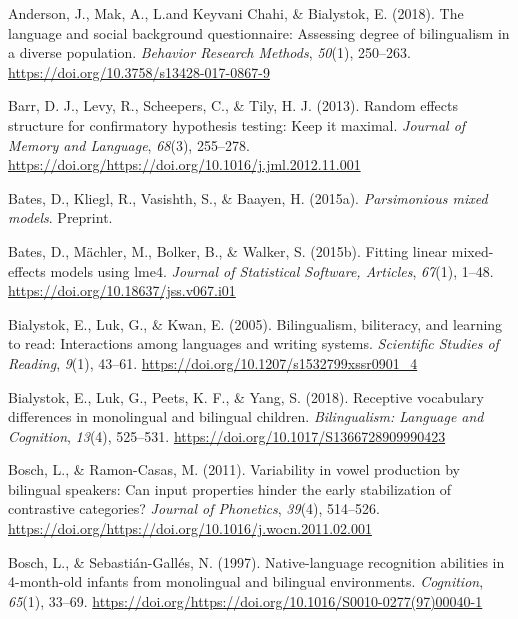\documentclass[,man,floatsintext]{apa6}
\begin{document}
\begingroup
\setlength{\parindent}{-0.5in}
\setlength{\leftskip}{0.5in}

\hypertarget{refs}{}
\leavevmode\hypertarget{ref-anderson_2018}{}%
Anderson, J., Mak, A., L.and Keyvani Chahi, \& Bialystok, E. (2018). The language and social background questionnaire: Assessing degree of bilingualism in a diverse population. \emph{Behavior Research Methods}, \emph{50}(1), 250--263. \url{https://doi.org/10.3758/s13428-017-0867-9}

\leavevmode\hypertarget{ref-barr_2013}{}%
Barr, D. J., Levy, R., Scheepers, C., \& Tily, H. J. (2013). Random effects structure for confirmatory hypothesis testing: Keep it maximal. \emph{Journal of Memory and Language}, \emph{68}(3), 255--278. \url{https://doi.org/https://doi.org/10.1016/j.jml.2012.11.001}

\leavevmode\hypertarget{ref-bates_2015a}{}%
Bates, D., Kliegl, R., Vasishth, S., \& Baayen, H. (2015a). \emph{Parsimonious mixed models}. Preprint.

\leavevmode\hypertarget{ref-bates_2015b}{}%
Bates, D., Mächler, M., Bolker, B., \& Walker, S. (2015b). Fitting linear mixed-effects models using lme4. \emph{Journal of Statistical Software, Articles}, \emph{67}(1), 1--48. \url{https://doi.org/10.18637/jss.v067.i01}

\leavevmode\hypertarget{ref-bialystok_2005}{}%
Bialystok, E., Luk, G., \& Kwan, E. (2005). Bilingualism, biliteracy, and learning to read: Interactions among languages and writing systems. \emph{Scientific Studies of Reading}, \emph{9}(1), 43--61. \url{https://doi.org/10.1207/s1532799xssr0901_4}

\leavevmode\hypertarget{ref-bialystok_2018}{}%
Bialystok, E., Luk, G., Peets, K. F., \& Yang, S. (2018). Receptive vocabulary differences in monolingual and bilingual children. \emph{Bilingualism: Language and Cognition}, \emph{13}(4), 525--531. \url{https://doi.org/10.1017/S1366728909990423}

\leavevmode\hypertarget{ref-bosch_2011}{}%
Bosch, L., \& Ramon-Casas, M. (2011). Variability in vowel production by bilingual speakers: Can input properties hinder the early stabilization of contrastive categories? \emph{Journal of Phonetics}, \emph{39}(4), 514--526. \url{https://doi.org/https://doi.org/10.1016/j.wocn.2011.02.001}

\leavevmode\hypertarget{ref-bosch_1997}{}%
Bosch, L., \& Sebastián-Gallés, N. (1997). Native-language recognition abilities in 4-month-old infants from monolingual and bilingual environments. \emph{Cognition}, \emph{65}(1), 33--69. \url{https://doi.org/https://doi.org/10.1016/S0010-0277(97)00040-1}
\end{document}

